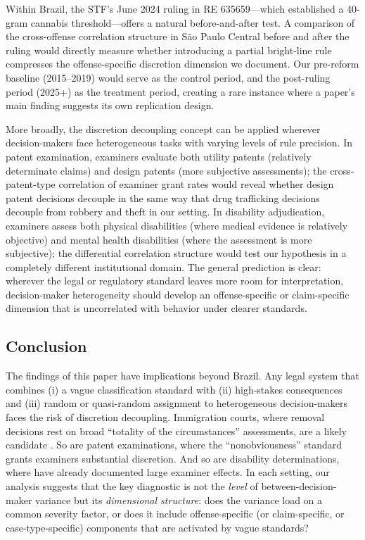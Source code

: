 \documentclass[12pt]{article}
\begin{document}
Within Brazil, the STF's June 2024 ruling in RE 635659---which established a 40-gram cannabis threshold---offers a natural before-and-after test. A comparison of the cross-offense correlation structure in S\~ao Paulo Central before and after the ruling would directly measure whether introducing a partial bright-line rule compresses the offense-specific discretion dimension we document. Our pre-reform baseline (2015--2019) would serve as the control period, and the post-ruling period (2025+) as the treatment period, creating a rare instance where a paper's main finding suggests its own replication design.

More broadly, the discretion decoupling concept can be applied wherever decision-makers face heterogeneous tasks with varying levels of rule precision. In patent examination, examiners evaluate both utility patents (relatively determinate claims) and design patents (more subjective assessments); the cross-patent-type correlation of examiner grant rates would reveal whether design patent decisions decouple in the same way that drug trafficking decisions decouple from robbery and theft in our setting. In disability adjudication, examiners assess both physical disabilities (where medical evidence is relatively objective) and mental health disabilities (where the assessment is more subjective); the differential correlation structure would test our hypothesis in a completely different institutional domain. The general prediction is clear: wherever the legal or regulatory standard leaves more room for interpretation, decision-maker heterogeneity should develop an offense-specific or claim-specific dimension that is uncorrelated with behavior under clearer standards.

\subsection{Conclusion}

The findings of this paper have implications beyond Brazil. Any legal system that combines (i) a vague classification standard with (ii) high-stakes consequences and (iii) random or quasi-random assignment to heterogeneous decision-makers faces the risk of discretion decoupling. Immigration courts, where removal decisions rest on broad ``totality of the circumstances'' assessments, are a likely candidate \citep{kling2006}. So are patent examinations, where the ``nonobviousness'' standard grants examiners substantial discretion. And so are disability determinations, where \citet{maestas2013} have already documented large examiner effects. In each setting, our analysis suggests that the key diagnostic is not the \textit{level} of between-decision-maker variance but its \textit{dimensional structure}: does the variance load on a common severity factor, or does it include offense-specific (or claim-specific, or case-type-specific) components that are activated by vague standards?
\end{document}
